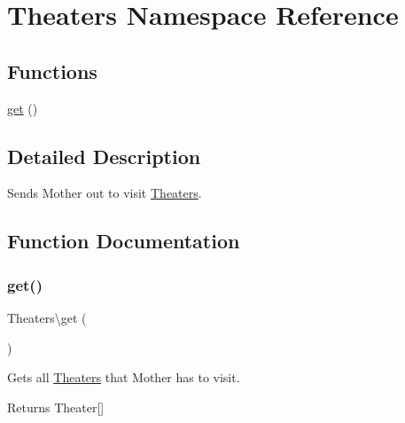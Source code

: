 \hypertarget{namespaceTheaters}{}\section{Theaters Namespace Reference}
\label{namespaceTheaters}
\subsection*{Functions}
\begin{DoxyCompactItemize}
\item 
\hyperlink{namespaceTheaters_aa38081920edb1444c154946fccbb71cf}{get} ()
\end{DoxyCompactItemize}


\subsection{Detailed Description}
Sends Mother out to visit \hyperlink{namespaceTheaters}{Theaters}. 

\subsection{Function Documentation}
\mbox{\label{namespaceTheaters_aa38081920edb1444c154946fccbb71cf}} 
\subsubsection{\texorpdfstring{get()}{get()}}
{\footnotesize\ttfamily Theaters\textbackslash{}get (\begin{DoxyParamCaption}{ }\end{DoxyParamCaption})}

Gets all \hyperlink{namespaceTheaters}{Theaters} that Mother has to visit.

\begin{DoxyReturn}{Returns}
Theater\mbox{[}\mbox{]} 
\end{DoxyReturn}
